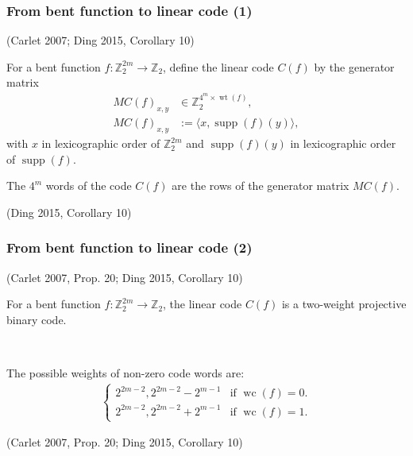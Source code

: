 \documentclass[pdf,sprung,slideColor,nocolorBG]{beamer}
\newcommand{\slidecite}[1]{\tiny{(#1)}\normalsize{}}
\newcommand{\smallcite}[1]{\small{(#1)}\normalsize{}}
\newcommand{\mb}[1]{\mathbb{#1}}
\newcommand{\To}{\rightarrow}
\newcommand{\support}[1]{\operatorname{supp}\left(#1\right)}
\newcommand{\weight}[1]{\operatorname{wt}\left(#1\right)}
\newcommand{\weightclass}[1]{\operatorname{wc}\left(#1\right)}
\newcommand{\Z}{\mb{Z}}
\begin{document}
\begin{frame}
\frametitle{From bent function to linear code (1)}
\begin{Definition}

\smallcite{Carlet 2007; Ding 2015, Corollary 10} 

For a bent function $f : \Z_2^{2m} \To \Z_2$, 
define the linear code $C(f)$ by the generator matrix
\begin{align*}
M C(f)_{x,y} &\in \Z_2^{4^m \times \weight{f}},
\\
M C(f)_{x,y} &:= \langle x, \support{f}(y) \rangle,
\end{align*}
with $x$ in lexicographic order of $\Z_2^{2m}$ 
and $\support{f}(y)$ in lexicographic order of $\support{f}$.

The $4^m$ words of the code $C(f)$ are the rows of the generator matrix $M C(f)$.
\end{Definition}

\slidecite{Ding 2015, Corollary 10} 
 
\end{frame}
\begin{frame}
\frametitle{From bent function to linear code (2)}
\begin{Theorem}
\smallcite{Carlet 2007, Prop. 20; Ding 2015, Corollary 10} 

For a bent function $f : \Z_2^{2m} \To \Z_2$, the linear code $C(f)$
is a two-weight projective binary code.

~

The possible weights of non-zero code words are:
\begin{align*}
\begin{cases}
2^{2m-2}, 2^{2m-2} - 2^{m-1} & \text{if~} \weightclass{f}=0.
\\
2^{2m-2}, 2^{2m-2} + 2^{m-1} & \text{if~} \weightclass{f}=1.
\end{cases}
\end{align*}

\end{Theorem}

\slidecite{Carlet 2007, Prop. 20; Ding 2015, Corollary 10} 
 
\end{frame}
\end{document}
